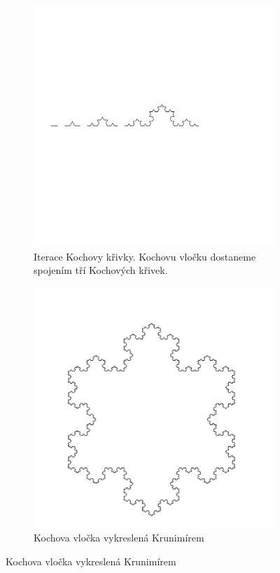 \begin{figure}
  \centering
  \caption{Kochova vločka}
  \label{fig:krunimir-koch-all}

  \begin{subfigure}{0.8\textwidth}
    \includegraphics[width=\textwidth,trim=0 250 150 200]{krunimir/examples/koch-gen}
    \caption{Iterace Kochovy křivky. Kochovu vločku dostaneme spojením
    tří Kochových křivek.}
    \label{fig:krunimir-koch-gen}
  \end{subfigure}

  \begin{subfigure}{0.9\textwidth}
    \includegraphics[width=\textwidth]{krunimir/examples/koch}
    \caption{Kochova vločka vykreslená Krunimírem}
    \label{fig:krunimir-koch}
  \end{subfigure}
\end{figure}

